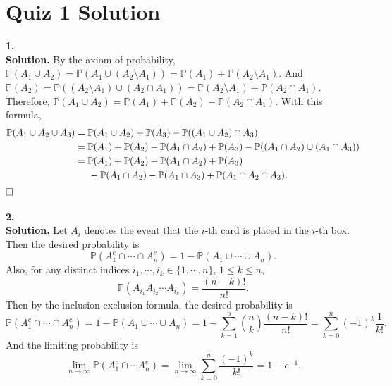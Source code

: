 \documentclass[12pt]{article}
\begin{document}
\section*{Quiz 1 Solution}
\textbf{1.}\\
\textbf{Solution.} By the axiom of probability, $\mathbb{P}(A_1\cup A_2)=\mathbb{P}(A_1\cup(A_2\setminus A_1))=\mathbb{P}(A_1)+\mathbb{P}(A_2\setminus A_1)$. And $\mathbb{P}(A_2)=\mathbb{P}((A_2\setminus A_1)\cup(A_2\cap A_1))=\mathbb{P}(A_2\setminus A_1)+\mathbb{P}(A_2\cap A_1)$. Therefore, $\mathbb{P}(A_1\cup A_2)=\mathbb{P}(A_1)+\mathbb{P}(A_2)-\mathbb{P}(A_2\cap A_1)$. With this formula,
\begin{equation*}
\begin{aligned}
\mathbb{P}(A_1\cup A_2\cup A_3) &= \mathbb{P}(A_1\cup A_2)+\mathbb{P}(A_3)-\mathbb{P}((A_1\cup A_2)\cap A_3) \\&
=\mathbb{P}(A_1)+\mathbb{P}(A_2)-\mathbb{P}(A_1\cap A_2)+\mathbb{P}(A_3)-\mathbb{P}((A_1\cap A_2)\cup(A_1\cap A_3)) \\&
=\mathbb{P}(A_1)+\mathbb{P}(A_2)-\mathbb{P}(A_1\cap A_2)+\mathbb{P}(A_3)
\\&
\hspace{5mm}-\mathbb{P}(A_1\cap A_2)-\mathbb{P}(A_1\cap A_3)+\mathbb{P}(A_1\cap A_2\cap A_3).
\end{aligned}
\end{equation*}
$\hspace{\fill}\square$
\\ \\
\textbf{2.} \\
\textbf{Solution.} Let $A_i$ denotes the event that the $i$-th card is placed in the $i$-th box. Then the desired probability is
\begin{equation*}
\mathbb{P}(A_1^c\cap\cdots\cap A_n^c)=1-\mathbb{P}(A_1\cup\cdots\cup A_n).
\end{equation*}
Also, for any distinct indices $i_1,\cdots,i_k\in\{1,\cdots,n\}$, $1\leq k\leq n$,
\begin{equation*}
\mathbb{P}(A_{i_1}A_{i_2}\cdots A_{i_k})=\frac{(n-k)!}{n!}.
\end{equation*}
Then by the inclusion-exclusion formula, the desired probability is
\begin{equation*}
\mathbb{P}(A_1^c\cap\cdots\cap A_n^c)=1-\mathbb{P}(A_1\cup\cdots\cup A_n)=1-\sum_{k=1}^n\binom{n}{k}\frac{(n-k)!}{n!}=\sum_{k=0}^n(-1)^k\frac{1}{k!}.
\end{equation*}
And the limiting probability is
\begin{equation*}
\lim_{n\rightarrow\infty}\mathbb{P}(A_1^c\cap\cdots A_n^c)=\lim_{n\rightarrow\infty}\sum_{k=0}^n\frac{(-1)^k}{k!}=1-e^{-1}.
\end{equation*}
\end{document}
